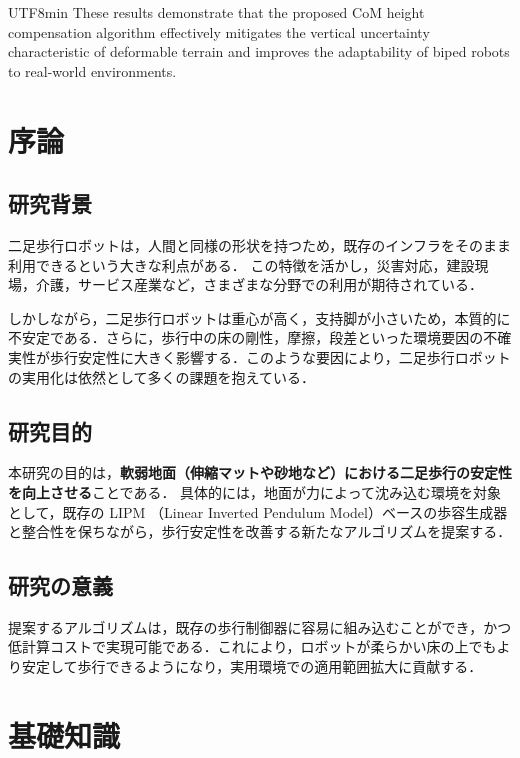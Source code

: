 \documentclass[a4paper,11pt]{report}
\begin{document}
\begin{CJK}{UTF8}{min}
These results demonstrate that the proposed CoM height compensation algorithm
effectively mitigates the vertical uncertainty characteristic of deformable terrain
and improves the adaptability of biped robots to real-world environments.


\tableofcontents

\chapter{序論}

\section{研究背景}
二足歩行ロボットは，人間と同様の形状を持つため，既存のインフラをそのまま利用できるという大きな利点がある．  
この特徴を活かし，災害対応，建設現場，介護，サービス産業など，さまざまな分野での利用が期待されている．

しかしながら，二足歩行ロボットは重心が高く，支持脚が小さいため，本質的に不安定である．さらに，歩行中の床の剛性，摩擦，段差といった環境要因の不確実性が歩行安定性に大きく影響する．このような要因により，二足歩行ロボットの実用化は依然として多くの課題を抱えている．

\section{研究目的}
本研究の目的は，\textbf{軟弱地面（伸縮マットや砂地など）における二足歩行の安定性を向上させる}ことである．  
具体的には，地面が力によって沈み込む環境を対象として，既存の LIPM （Linear Inverted Pendulum Model）ベースの歩容生成器と整合性を保ちながら，歩行安定性を改善する新たなアルゴリズムを提案する．

\section{研究の意義}
提案するアルゴリズムは，既存の歩行制御器に容易に組み込むことができ，かつ低計算コストで実現可能である．これにより，ロボットが柔らかい床の上でもより安定して歩行できるようになり，実用環境での適用範囲拡大に貢献する．

\chapter{基礎知識}


\end{CJK}
\end{document}
